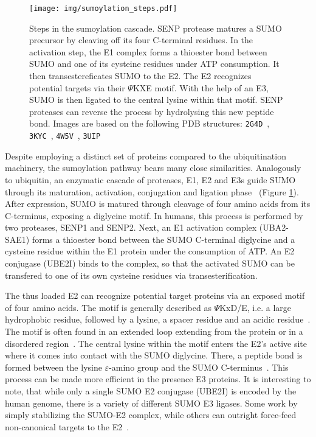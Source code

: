 \begin{figure}
	\centering
	\texttt{[image: img/sumoylation\_steps.pdf]}
	\caption{Steps in the sumoylation cascade. SENP protease matures a SUMO precursor by cleaving off its four C-terminal residues. In the activation step, the E1 complex forms a thioester bond  between SUMO and one of its cysteine residues under ATP consumption. It then transestereficates SUMO to the E2. The E2 recognizes potential targets via their $\Psi$KXE motif. With the help of an E3, SUMO is then ligated to the central lysine within that motif. SENP proteases can reverse the process by hydrolysing this new peptide bond. Images are based on the following PDB structures: \texttt{2G4D}~\cite{Xu2006}, \texttt{3KYC}~\cite{Olsen2010}, \texttt{4W5V}~\cite{ReiterEtAl}, \texttt{3UIP}~\cite{Gareau2012}}
	\label{fig:sumoylation_steps}
\end{figure}

Despite employing a distinct set of proteins compared to the ubiquitination machinery, the sumoylation pathway bears many close similarities. Analogously to ubiquitin, an enzymatic cascade of proteases, E1, E2 and E3s guide SUMO through its maturation, activation, conjugation and ligation phase~\cite{sumoylation} (Figure \ref{fig:sumoylation_steps}). After expression, SUMO is matured through cleavage of four amino acids from its C-terminus, exposing a diglycine motif. In humans, this process is performed by two proteases, SENP1 and SENP2. Next, an E1 activation complex (UBA2-SAE1) forms a thioester bond between the SUMO C-terminal diglycine and a cysteine residue within the E1 protein under the consumption of ATP. An E2 conjugase (UBE2I) binds to the complex, so that the activated SUMO can be transfered to one of its own cysteine residues via transesterification. 

The thus loaded E2 can recognize potential target proteins via an exposed motif of four amino acids. The motif is generally described as $\Psi$KxD/E, i.e. a large hydrophobic residue, followed by a lysine, a spacer residue and an acidic residue~\cite{Sampson2001}. The motif is often found in an extended loop extending from the protein or in a disordered region~. The central lysine within the motif enters the E2’s active site where it comes into contact with the SUMO diglycine. There, a peptide bond is formed between the lysine $\varepsilon$-amino group and the SUMO C-terminus~\cite{BernierVillamor2002}. This process can be made more efficient in the presence E3 proteins. It is interesting to note, that while only a single SUMO E2 conjugase (UBE2I) is encoded by the human genome, there is a variety of different SUMO E3 ligases. Some work by simply stabilizing the SUMO-E2 complex, while others can outright force-feed non-canonical targets to the E2~\cite{Streich2016}. 


